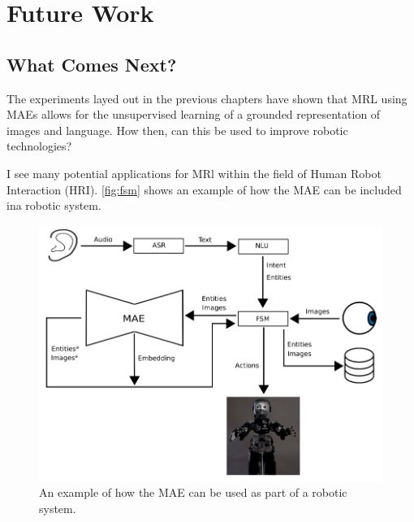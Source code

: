 
\chapter{Future Work} %

\label{Chapter8} %



\section{What Comes Next?}
The experiments layed out in the previous chapters have shown that MRL using MAEs allows for the unsupervised learning of a grounded representation of images and language. How then, can this be used to improve robotic technologies?

I see many potential applications for MRl within the field of Human Robot Interaction (HRI). \autoref{fig:fsm} shows an example of how the MAE can be included ina robotic system.


\begin{figure}
\centering
\includegraphics[width=\textwidth]{Figs/futureWork/fsm.png}
\caption{An example of how the MAE can be used as part of a robotic system.}
\label{fig:fsm}
\end{figure}

